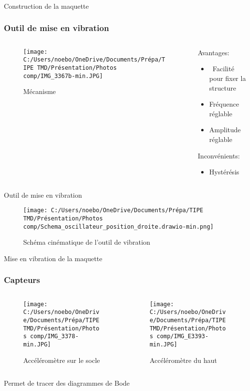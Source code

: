 \documentclass{beamer}
\begin{document}
	
	\begin{frame}{Construction de la maquette}
		\frametitle{Outil de mise en vibration}
 
		\begin{columns}
			\begin{column}{0.5\textwidth}
				\begin{figure}
					\texttt{[image: C:/Users/noebo/OneDrive/Documents/Prépa/TIPE TMD/Présentation/Photos comp/IMG\_3367b-min.JPG]}
					\caption{Mécanisme}
				\end{figure}
			\end{column}
			\begin{column}{0.5\textwidth}
				Avantages:
				\begin{itemize}
					\item\ Facilité pour fixer la structure
					\item Fréquence réglable \\
					\item Amplitude réglable 
				\end{itemize}
				\vspace{12pt}
				Inconvénients:
				
				\begin{itemize}
					\item Hystérésis
				\end{itemize}
			\end{column}
		\end{columns}
	\end{frame}

\begin{frame}{Outil de mise en vibration}
	\begin{figure}
		\texttt{[image: C:/Users/noebo/OneDrive/Documents/Prépa/TIPE TMD/Présentation/Photos comp/Schema\_oscillateur\_position\_droite.drawio-min.png]}
		\caption{Schéma cinématique de l'outil de vibration}
	\end{figure}
\end{frame}

	\begin{frame}{Mise en vibration de la maquette}
	
	\frametitle{Capteurs}
	\begin{columns}
		\begin{column}{0.25\textwidth}
			\begin{figure}
				\texttt{[image: C:/Users/noebo/OneDrive/Documents/Prépa/TIPE TMD/Présentation/Photos comp/IMG\_3378-min.JPG]}
				\caption{Accéléromètre sur le socle}
			\end{figure}
		\end{column}
		\begin{column}{0.5\textwidth}
			\begin{figure}
				\texttt{[image: C:/Users/noebo/OneDrive/Documents/Prépa/TIPE TMD/Présentation/Photos comp/IMG\_E3393-min.JPG]}
				\caption{Accéléromètre du haut}
			\end{figure}
		\end{column}
	\end{columns}
	Permet de tracer des diagrammes de Bode 
\end{frame}
	
\end{document}
